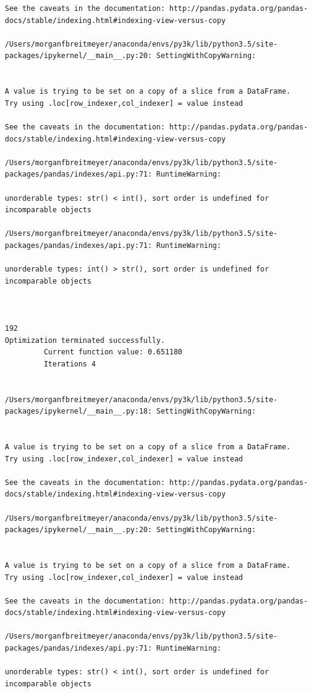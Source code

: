 \begin{lstlisting}
See the caveats in the documentation: http://pandas.pydata.org/pandas-docs/stable/indexing.html#indexing-view-versus-copy

/Users/morganfbreitmeyer/anaconda/envs/py3k/lib/python3.5/site-packages/ipykernel/__main__.py:20: SettingWithCopyWarning:


A value is trying to be set on a copy of a slice from a DataFrame.
Try using .loc[row_indexer,col_indexer] = value instead

See the caveats in the documentation: http://pandas.pydata.org/pandas-docs/stable/indexing.html#indexing-view-versus-copy

/Users/morganfbreitmeyer/anaconda/envs/py3k/lib/python3.5/site-packages/pandas/indexes/api.py:71: RuntimeWarning:

unorderable types: str() < int(), sort order is undefined for incomparable objects

/Users/morganfbreitmeyer/anaconda/envs/py3k/lib/python3.5/site-packages/pandas/indexes/api.py:71: RuntimeWarning:

unorderable types: int() > str(), sort order is undefined for incomparable objects



192
Optimization terminated successfully.
         Current function value: 0.651180
         Iterations 4


/Users/morganfbreitmeyer/anaconda/envs/py3k/lib/python3.5/site-packages/ipykernel/__main__.py:18: SettingWithCopyWarning:


A value is trying to be set on a copy of a slice from a DataFrame.
Try using .loc[row_indexer,col_indexer] = value instead

See the caveats in the documentation: http://pandas.pydata.org/pandas-docs/stable/indexing.html#indexing-view-versus-copy

/Users/morganfbreitmeyer/anaconda/envs/py3k/lib/python3.5/site-packages/ipykernel/__main__.py:20: SettingWithCopyWarning:


A value is trying to be set on a copy of a slice from a DataFrame.
Try using .loc[row_indexer,col_indexer] = value instead

See the caveats in the documentation: http://pandas.pydata.org/pandas-docs/stable/indexing.html#indexing-view-versus-copy

/Users/morganfbreitmeyer/anaconda/envs/py3k/lib/python3.5/site-packages/pandas/indexes/api.py:71: RuntimeWarning:

unorderable types: str() < int(), sort order is undefined for incomparable objects


\end{lstlisting}
